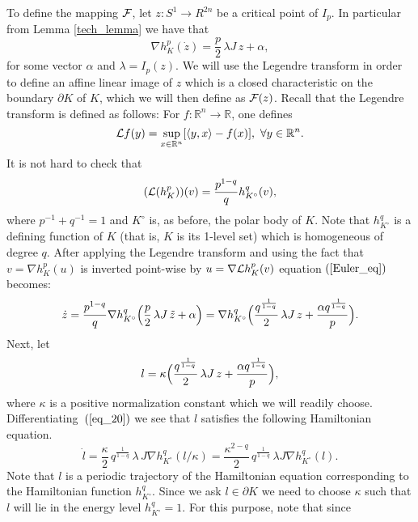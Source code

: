 \documentclass[12pt]{article}
\begin{document}
To define the mapping ${\cal F}$, let $z: S^1\to R^{2n}$ be a
critical point of $I_p$.
 In particular from Lemma
\ref{tech_lemma} we have that
 \begin{equation} \label{Euler_eqt}
\nabla h_K^p ({\dot {z}}) = {\frac p 2} \,  \lambda J \, { z} +
\alpha,
\end{equation}
for some vector $\alpha$ and $\lambda = I_p(z)$. We will use the
Legendre transform in order to define an affine linear image of
$z$ which is a closed characteristic on the boundary $\partial K$
of $K$, which we will then define as ${\cal F}(z)$. Recall that
the Legendre transform is defined as follows: For $f : {\mathbb
R}^{n} \rightarrow {\mathbb R}$, one defines
$$ {\cal L} f(y) = \sup_{x \in {\mathbb R}^n} [ \langle y , x
\rangle - f(x) ], \ \forall y \in {\mathbb R}^n.$$
%
It is not hard to
check that
\[ ({\cal L} (h_K^p))(v) =
{\frac {p^{1-q}} q} h_{K^\circ}^q (v), \] where $p^{-1} + q^{-1} =1
$
and  $K^{\circ}$
is, as before, the polar body of $K$. Note that $h^q_{K^{\circ}}$ is
a defining function of $K$ (that is, $K$ is its 1-level set) which
is homogeneous of degree $q$. After applying the Legendre transform
and using the fact that $v =  \nabla h_K^p(u)$ is inverted
point-wise by $u = \nabla {\cal L} h_K^p(v)$ equation
$(\ref{Euler_eq})$ becomes:
%
%
\[ {\dot {z}} =   {\frac  {p^{1-q}}  q} \nabla h_{K^{\circ}}^q \Bigl
({\frac p 2} \,  \lambda J \, \tilde z + \alpha \Bigr)  =  \nabla
h_{K^{\circ}}^q \Bigl ({\frac {q^{ {\frac 1 {1-q}}  }} 2} \, \lambda
J \,  z + {\frac {\alpha q^{ {\frac 1 {1-q}}}} p} \Bigr). \]
 Next, let
\begin{equation} \label{eq_20} l = {\kappa} \Bigl ({\frac
{q^{ {\frac 1 {1-q}}}} 2} \,  \lambda J \, z + {\frac {\alpha q^{
{\frac 1 {1-q}}}} p} \Bigr),
\end{equation}
where $\kappa$ is a positive normalization constant which we will
readily choose. Differentiating~$(\ref{eq_20})$ we see  that $l$
satisfies the following Hamiltonian equation. \begin{equation}
\label{l-Ham-eq} {\dot {l}} = {\frac \kappa 2}\, {{q^{ {\frac 1
{1-q}}}} } \,\lambda \, J \nabla h_{K^{\circ}}^q ( { {l}/ \kappa})
= {\frac {\kappa^{2-q}} 2} \, {{q^{ {\frac 1 {1-q}}}} } \, \lambda
J \nabla h_{K^{\circ}}^q (
 l).\end{equation}
%
 Note that $l$ is a periodic trajectory of the
Hamiltonian equation corresponding to the Hamiltonian function
$h_{K^{\circ}}^q$. Since we ask $l \in {\partial K}$ we need to
choose $\kappa$ such that $l$ will lie in the energy level
$h_{K^{\circ}}^q=1$. For this purpose, note that since
\end{document}

